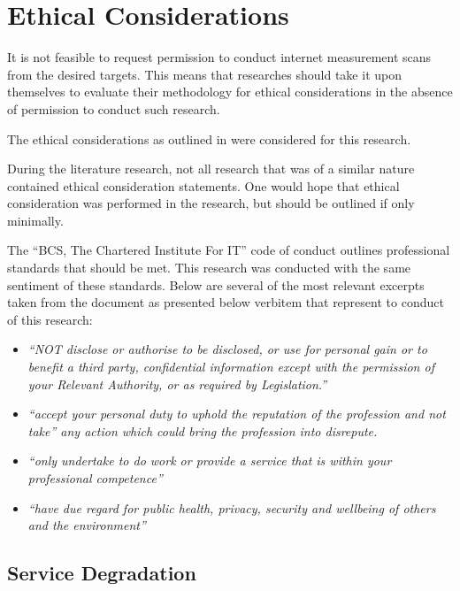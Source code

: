 \documentclass{mscreport}
\begin{document}
\section{Ethical Considerations}
\label{section:ethics}

It is not feasible to request permission to conduct internet measurement scans from the desired targets. This means that researches should take it upon themselves to evaluate their methodology for ethical considerations in the absence of permission to conduct such research.

\vspace{0.3cm} \noindent
The ethical considerations as outlined in \cite{Amann2017-co,Partridge2016-ph,Durumeric2015-zq,Kumar2017-qw} were considered for this research.

\vspace{0.3cm} \noindent
During the literature research, not all research that was of a similar nature contained ethical consideration statements. One would hope that ethical consideration was performed in the research, but should be outlined if only minimally.

\vspace{0.3cm} \noindent
The ``BCS, The Chartered Institute For IT'' code of conduct \cite{Bcs2011-rj} outlines professional standards that should be met. This research was conducted with the same sentiment of these standards. Below are several of the most relevant excerpts taken from the document as presented below verbitem that represent to conduct of this research:
\begin{itemize}
	\setlength\itemsep{0.1em}
	\item \textit{``NOT disclose or authorise to be disclosed, or use for personal gain or to benefit a third party, confidential information except with the permission of your Relevant Authority, or as required by Legislation.''}
	\item \textit{``accept your personal duty to uphold the reputation of the profession and not take''
any action which could bring the profession into disrepute.}
	\item \textit{``only undertake to do work or provide a service that is within your professional
competence''}
	\item \textit{``have due regard for public health, privacy, security and wellbeing of others and
the environment''}
\end{itemize}

\subsection{Service Degradation}
\end{document}
